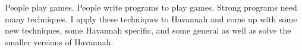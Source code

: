 

People play games. People write programs to play games. Strong programs need many techniques. I apply these techniques to Havannah and come up with some new techniques, some Havannah specific, and some general as well as solve the smaller versions of Havannah.

